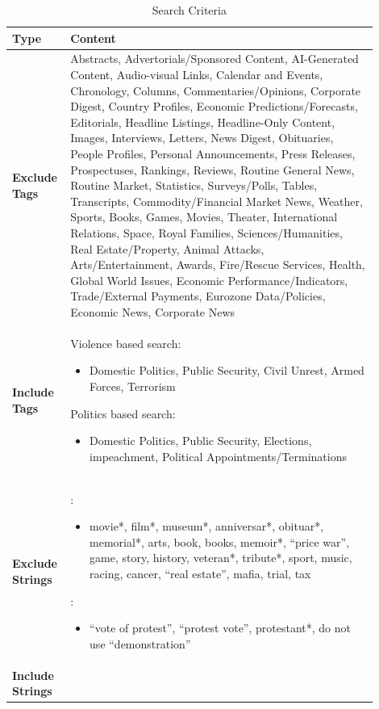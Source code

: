 \begin{table}[h!]
\caption{Search Criteria}
\label{tab:search_terms}
\centering
\scriptsize
\begin{tabular}{|p{0.1\linewidth}|p{0.8\linewidth}|}
\hline
\textbf{Type} & \textbf{Content} \\ \hline
\textbf{Exclude Tags} & Abstracts, Advertorials/Sponsored Content, AI-Generated Content, Audio-visual Links, Calendar and Events, Chronology, Columns, Commentaries/Opinions, Corporate Digest, Country Profiles, Economic Predictions/Forecasts, Editorials, Headline Listings, Headline-Only Content, Images, Interviews, Letters, News Digest, Obituaries, People Profiles, Personal Announcements, Press Releases, Prospectuses, Rankings, Reviews, Routine General News, Routine Market, Statistics, Surveys/Polls, Tables, Transcripts, Commodity/Financial Market News, Weather, Sports, Books, Games, Movies, Theater, International Relations, Space, Royal Families, Sciences/Humanities, Real Estate/Property, Animal Attacks, Arts/Entertainment, Awards, Fire/Rescue Services, Health, Global World Issues, Economic Performance/Indicators, Trade/External Payments, Eurozone Data/Policies, Economic News, Corporate News \\ \hline
\textbf{Include Tags} & Violence based search: \begin{itemize}
    \item Domestic Politics, Public Security, Civil Unrest, Armed Forces, Terrorism
     \end{itemize}
     Politics based search:
      \begin{itemize}
    \item Domestic Politics, Public Security, Elections, impeachment, Political Appointments/Terminations
\end{itemize}
\\ \hline
\textbf{Exclude Strings} & \cite{caldara2022}: \begin{itemize}
 \item movie*, film*, museum*, anniversar*, obituar*, memorial*, arts, book, books, memoir*, ``price war'', game, story, history, veteran*, tribute*, sport, music, racing, cancer, ``real estate'', mafia, trial, tax
 \end{itemize}
 \cite{BARRETT2022}: \begin{itemize}
 \item ``vote of protest'', ``protest vote'', protestant*, do not use ``demonstration'' 
\end{itemize} \\ \hline
\textbf{Include Strings} & 


\end{tabular}
\end{table}
